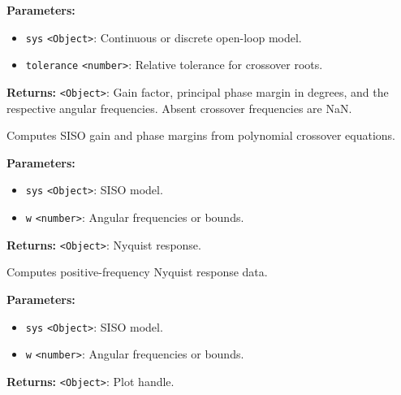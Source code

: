 \documentclass[12pt,a4paper]{article}
\begin{document}
\vspace{5mm}
\noindent {}


\noindent \textbf{Parameters:}
\begin{itemize}
  \item \texttt{sys} \texttt{<Object>}: Continuous or discrete open-loop model.
  \item \texttt{tolerance} \texttt{<number>}: Relative tolerance for crossover roots.
\end{itemize}

\noindent \textbf{Returns:} \texttt{<Object>}: Gain factor, principal phase margin in degrees,
and the respective angular frequencies. Absent crossover frequencies are NaN.

\noindent Computes SISO gain and phase margins from polynomial crossover equations.

\vspace{5mm}
\noindent {}


\noindent \textbf{Parameters:}
\begin{itemize}
  \item \texttt{sys} \texttt{<Object>}: SISO model.
  \item \texttt{w} \texttt{<number>}: Angular frequencies or bounds.
\end{itemize}

\noindent \textbf{Returns:} \texttt{<Object>}: Nyquist response.

\noindent Computes positive-frequency Nyquist response data.

\vspace{5mm}
\noindent {}


\noindent \textbf{Parameters:}
\begin{itemize}
  \item \texttt{sys} \texttt{<Object>}: SISO model.
  \item \texttt{w} \texttt{<number>}: Angular frequencies or bounds.
\end{itemize}

\noindent \textbf{Returns:} \texttt{<Object>}: Plot handle.
\end{document}
